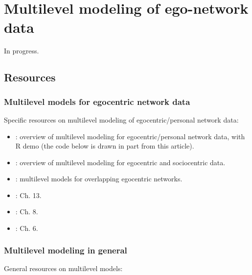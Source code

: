 \documentclass[
]{book}
\providecommand{\tightlist}{%
  \setlength{\itemsep}{0pt}\setlength{\parskip}{0pt}}
\begin{document}
\hypertarget{multilevel}{%
\chapter{Multilevel modeling of ego-network data}\label{multilevel}}

In progress.

\hypertarget{resources}{%
\section{Resources}\label{resources}}

\hypertarget{multilevel-models-for-egocentric-network-data}{%
\subsection{Multilevel models for egocentric network data}\label{multilevel-models-for-egocentric-network-data}}

Specific resources on multilevel modeling of egocentric/personal network data:

\begin{itemize}
\tightlist
\item
  \href{https://www.sa-ijas.org/ojs/index.php/sa-ijas/article/view/30-3}{\citet{vacca_multilevel_2018}}: overview of multilevel modeling for egocentric/personal network data, with R demo (the code below is drawn in part from this article).
\item
  \citet{simonoff_multilevel_2013}: overview of multilevel modeling for egocentric and sociocentric data.
\item
  \href{http://journals.sagepub.com/doi/10.1177/0049124119882450}{\citet{vacca_cross-classified_2019}}: multilevel models for overlapping egocentric networks.
\item
  \citet{mccarty_conducting_2019}: Ch. 13.
\item
  \citet{perry_egocentric_2018}: Ch. 8.
\item
  \citet{crossley_social_2015}: Ch. 6.
\end{itemize}

\hypertarget{multilevel-modeling-in-general}{%
\subsection{Multilevel modeling in general}\label{multilevel-modeling-in-general}}

General resources on multilevel models:
\end{document}
